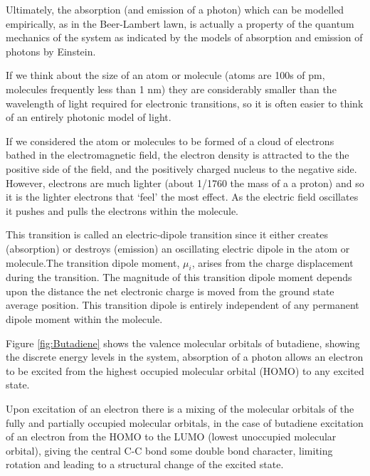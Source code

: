 \documentclass[
]{book}
\begin{document}
Ultimately, the absorption (and emission of a photon) which can be modelled empirically, as in the Beer-Lambert lawn, is actually a property of the quantum mechanics of the system as indicated by the models of absorption and emission of photons by Einstein.

If we think about the size of an atom or molecule (atoms are 100s of pm, molecules frequently less than 1 nm) they are considerably smaller than the wavelength of light required for electronic transitions, so it is often easier to think of an entirely photonic model of light.

If we considered the atom or molecules to be formed of a cloud of electrons bathed in the electromagnetic field, the electron density is attracted to the the positive side of the field, and the positively charged nucleus to the negative side. However, electrons are much lighter (about 1/1760 the mass of a a proton) and so it is the lighter electrons that `feel' the most effect. As the electric field oscillates it pushes and pulls the electrons within the molecule.

This transition is called an electric-dipole transition since it either creates (absorption) or destroys (emission) an oscillating electric dipole in the atom or molecule.The transition dipole moment, \(\mu_i\), arises from the charge displacement during the transition. The magnitude of this transition dipole moment depends upon the distance the net electronic charge is moved from the ground state average position. This transition dipole is entirely independent of any permanent dipole moment within the molecule.

Figure \ref{fig:Butadiene} shows the valence molecular orbitals of butadiene, showing the discrete energy levels in the system, absorption of a photon allows an electron to be excited from the highest occupied molecular orbital (HOMO) to any excited state.

Upon excitation of an electron there is a mixing of the molecular orbitals of the fully and partially occupied molecular orbitals, in the case of butadiene excitation of an electron from the HOMO to the LUMO (lowest unoccupied molecular orbital), giving the central C-C bond some double bond character, limiting rotation and leading to a structural change of the excited state.
\end{document}

